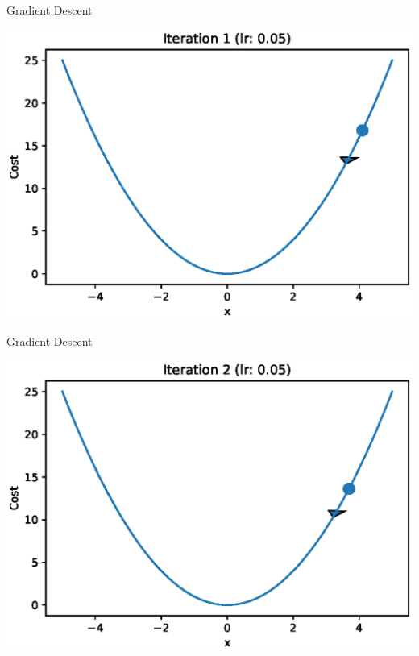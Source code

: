 \documentclass{beamer}
\begin{document}
	\begin{frame}{Gradient Descent}
		\begin{center}
			\includegraphics[totalheight=6cm]{gradient-descent/iteration-1.eps}
		\end{center}
	\end{frame}
	
	\begin{frame}{Gradient Descent}
		\begin{center}
			\includegraphics[totalheight=6cm]{gradient-descent/iteration-2.eps}
		\end{center}
	\end{frame}
	
\end{document}

